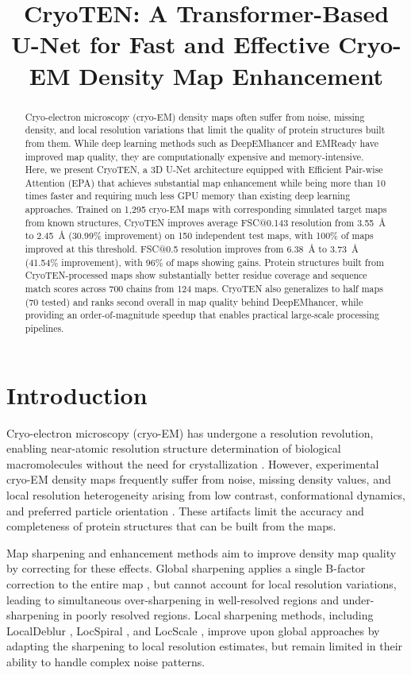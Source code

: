 \documentclass[11pt]{article}
\title{CryoTEN: A Transformer-Based U-Net for Fast and Effective Cryo-EM Density Map Enhancement}
\author{%
}
\date{}
\begin{document}
\maketitle

\begin{abstract}
Cryo-electron microscopy (cryo-EM) density maps often suffer from noise, missing density, and local resolution variations that limit the quality of protein structures built from them. While deep learning methods such as DeepEMhancer and EMReady have improved map quality, they are computationally expensive and memory-intensive. Here, we present CryoTEN, a 3D U-Net architecture equipped with Efficient Pair-wise Attention (EPA) that achieves substantial map enhancement while being more than 10 times faster and requiring much less GPU memory than existing deep learning approaches. Trained on 1,295 cryo-EM maps with corresponding simulated target maps from known structures, CryoTEN improves average FSC@0.143 resolution from 3.55~\AA{} to 2.45~\AA{} (30.99\% improvement) on 150 independent test maps, with 100\% of maps improved at this threshold. FSC@0.5 resolution improves from 6.38~\AA{} to 3.73~\AA{} (41.54\% improvement), with 96\% of maps showing gains. Protein structures built from CryoTEN-processed maps show substantially better residue coverage and sequence match scores across 700 chains from 124 maps. CryoTEN also generalizes to half maps (70 tested) and ranks second overall in map quality behind DeepEMhancer, while providing an order-of-magnitude speedup that enables practical large-scale processing pipelines.
\end{abstract}

\section{Introduction}

Cryo-electron microscopy (cryo-EM) has undergone a resolution revolution, enabling near-atomic resolution structure determination of biological macromolecules without the need for crystallization \citep{Kuhlbrandt2014,Cheng2015,Nogales2016}. However, experimental cryo-EM density maps frequently suffer from noise, missing density values, and local resolution heterogeneity arising from low contrast, conformational dynamics, and preferred particle orientation \citep{Scheres2012,Henderson2013}. These artifacts limit the accuracy and completeness of protein structures that can be built from the maps.

Map sharpening and enhancement methods aim to improve density map quality by correcting for these effects. Global sharpening applies a single B-factor correction to the entire map \citep{Rosenthal2003}, but cannot account for local resolution variations, leading to simultaneous over-sharpening in well-resolved regions and under-sharpening in poorly resolved regions. Local sharpening methods, including LocalDeblur \citep{RamirezAportela2020}, LocSpiral \citep{Kaur2021}, and LocScale \citep{Jakobi2017}, improve upon global approaches by adapting the sharpening to local resolution estimates, but remain limited in their ability to handle complex noise patterns.
\end{document}
